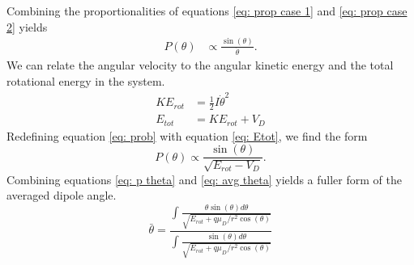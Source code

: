 Combining the proportionalities of equations \ref{eq: prop case 1} and \ref{eq: prop case 2} yields
\begin{align}
    P(\theta) & \propto \frac{\sin(\theta)}{\dot{\theta}}. \label{eq: prob}
\end{align}
We can relate the angular velocity to the angular kinetic energy and the total rotational energy in the system.
\begin{align}
    KE_{rot} & = \frac{1}{2}I\dot{\theta}^2 \nonumber \\
    E_{tot} & = KE_{rot} + V_D \label{eq: Etot}
\end{align}
Redefining equation \ref{eq: prob} with equation \ref{eq: Etot}, we find the form
\begin{equation}
    P(\theta) \propto \frac{\sin(\theta)}{\sqrt{E_{rot}-V_D}}. \label{eq: p theta}
\end{equation}
Combining equations \ref{eq: p theta} and \ref{eq: avg theta} yields a fuller form of the averaged dipole angle.
\begin{equation}
    \bar{\theta} = \dfrac{\displaystyle \int\frac{\theta \sin(\theta)d\theta}{\sqrt{E_{rot}+q\mu_D/r^2 \cos(\theta)}}}{\displaystyle \int\frac{\sin(\theta)d\theta}{\sqrt{E_{rot}+q\mu_D/r^2 \cos(\theta)}}} \label{eq: avg theta int}
\end{equation}

